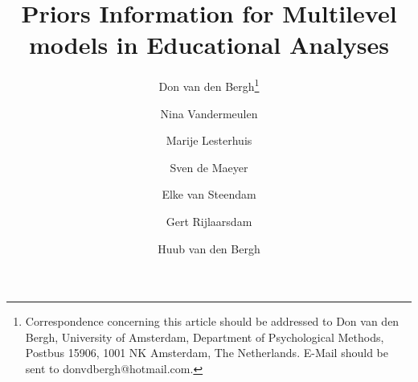 \documentclass[a4paper]{article}
\author[1]{Don van den Bergh\thanks{Correspondence concerning this article should be addressed to
Don van den Bergh, University of Amsterdam, Department of Psychological Methods, Postbus 15906, 1001 NK Amsterdam, The Netherlands. E-Mail should be sent to donvdbergh@hotmail.com.}}
\author[2]{Nina Vandermeulen}
\author[2]{Marije Lesterhuis}
\author[2]{Sven de Maeyer}
\author[2]{Elke van Steendam}
\author[2]{Gert Rijlaarsdam}
\author[3]{Huub van den Bergh}
\affil[1]{University of Amsterdam}
\affil[2]{University of Antwerp}
\affil[3]{University of Utrecht}
\title{Priors Information for Multilevel models in Educational Analyses}
\date{}
\newcommand*{\DEBUG}{}%
\newcommand{\GRa}	[1]		{\todo[inline, 	linecolor=gray, backgroundcolor=white]	{Gert: 	{#1}}}
\newcommand{\GRa}	[1]		{}
\renewcommand{\thefootnote}{\fnsymbol{footnote}}
\begin{document}
\ifdefined\DEBUG


\fi

\maketitle
\renewcommand{\thefootnote}{\arabic{footnote}}

\begin{abstract}
%


\end{abstract}
\end{document}
